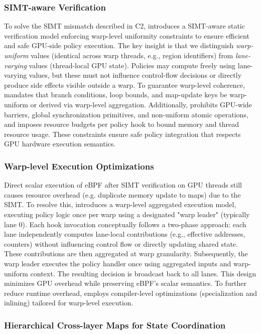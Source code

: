 \subsubsection{SIMT-aware Verification}

To solve the SIMT mismatch described in C2, \sys introduces a SIMT-aware static verification model enforcing warp-level uniformity constraints to ensure efficient and safe GPU-side policy execution.
The key insight is that we distinguish \emph{warp-uniform} values (identical across warp threads, e.g., region identifiers) from \emph{lane-varying} values (thread-local GPU state). Policies may compute freely using lane-varying values, but these must not influence control-flow decisions or directly produce side effects visible outside a warp. To guarantee warp-level coherence, \sys mandates that branch conditions, loop bounds, and map-update keys be warp-uniform or derived via warp-level aggregation. Additionally, \sys prohibits GPU-wide barriers, global synchronization primitives, and non-uniform atomic operations, and imposes resource budgets per policy hook to bound memory and thread resource usage. These constraints ensure safe policy integration that respects GPU hardware execution semantics.

\subsubsection{Warp-level Execution Optimizations}

Direct scalar execution of eBPF after SIMT verification on GPU threads still causes resource overhead (e.g. duplicate memory update to maps) due to the SIMT. To resolve this, \sys introduces a warp-level aggregated execution model, executing policy logic once per warp using a designated "warp leader" (typically lane 0). Each hook invocation conceptually follows a two-phase approach: each lane independently computes lane-local contributions (e.g., effective addresses, counters) without influencing control flow or directly updating shared state. These contributions are then aggregated at warp granularity. Subsequently, the warp leader executes the policy handler once using aggregated inputs and warp-uniform context. The resulting decision is broadcast back to all lanes. This design minimizes GPU overhead while preserving eBPF's scalar semantics. To further reduce runtime overhead, \sys employs compiler-level optimizations (specialization and inlining) tailored for warp-level execution.

\subsubsection{Hierarchical Cross-layer Maps for State Coordination}

